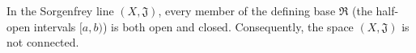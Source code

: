 In the Sorgenfrey line $(X, \mathfrak{J})$, every member of the defining base $\mathfrak{R}$ (the half-open intervals $[a, b)$) is both open and closed. Consequently, the space $(X, \mathfrak{J})$ is not connected.
